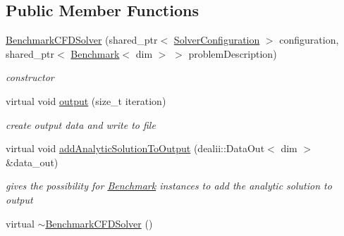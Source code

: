 \subsection*{Public Member Functions}
\begin{DoxyCompactItemize}
\item 
\hypertarget{classnatrium_1_1BenchmarkCFDSolver_ac43f8244c3408f367b192cced7be94ab}{
\hyperlink{classnatrium_1_1BenchmarkCFDSolver_ac43f8244c3408f367b192cced7be94ab}{BenchmarkCFDSolver} (shared\_\-ptr$<$ \hyperlink{classnatrium_1_1SolverConfiguration}{SolverConfiguration} $>$ configuration, shared\_\-ptr$<$ \hyperlink{classnatrium_1_1Benchmark}{Benchmark}$<$ dim $>$ $>$ problemDescription)}
\label{classnatrium_1_1BenchmarkCFDSolver_ac43f8244c3408f367b192cced7be94ab}

\begin{DoxyCompactList}\small\item\em constructor \item\end{DoxyCompactList}\item 
\hypertarget{classnatrium_1_1BenchmarkCFDSolver_a9708132fc0cef4ae55e3453672891c81}{
virtual void \hyperlink{classnatrium_1_1BenchmarkCFDSolver_a9708132fc0cef4ae55e3453672891c81}{output} (size\_\-t iteration)}
\label{classnatrium_1_1BenchmarkCFDSolver_a9708132fc0cef4ae55e3453672891c81}

\begin{DoxyCompactList}\small\item\em create output data and write to file \item\end{DoxyCompactList}\item 
\hypertarget{classnatrium_1_1BenchmarkCFDSolver_a96be8add7c888ef4e6a1cb41cd2b40f6}{
virtual void \hyperlink{classnatrium_1_1BenchmarkCFDSolver_a96be8add7c888ef4e6a1cb41cd2b40f6}{addAnalyticSolutionToOutput} (dealii::DataOut$<$ dim $>$ \&data\_\-out)}
\label{classnatrium_1_1BenchmarkCFDSolver_a96be8add7c888ef4e6a1cb41cd2b40f6}

\begin{DoxyCompactList}\small\item\em gives the possibility for \hyperlink{classnatrium_1_1Benchmark}{Benchmark} instances to add the analytic solution to output \item\end{DoxyCompactList}\item 
\hypertarget{classnatrium_1_1BenchmarkCFDSolver_aafd3c01db648420ce6d98a8349bdfa09}{
virtual \hyperlink{classnatrium_1_1BenchmarkCFDSolver_aafd3c01db648420ce6d98a8349bdfa09}{$\sim$BenchmarkCFDSolver} ()}
\label{classnatrium_1_1BenchmarkCFDSolver_aafd3c01db648420ce6d98a8349bdfa09}


\end{DoxyCompactItemize}
